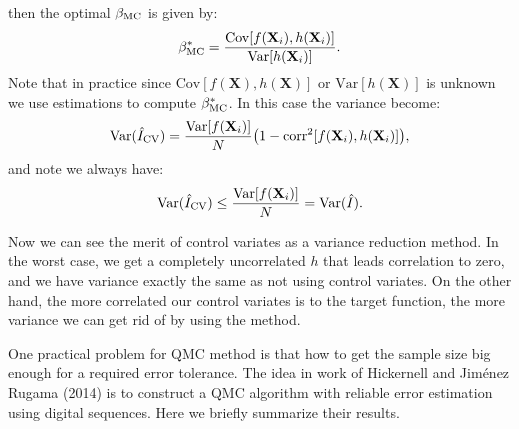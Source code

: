then the optimal $\beta_{\mathrm{MC}}$ is given by: 
\begin{equation}
    \beta_{\mathrm{MC}}^*=\frac{\mathrm{Cov}[f(\mathbf{X}_i),h(\mathbf{X}_i)]}{\mathrm{Var}[h(\mathbf{X}_i)]}.
    \label{eq:optBeta}
\end{equation}
Note that in practice since $\mathrm{Cov}[f(\mathbf{X}),h(\mathbf{X})]$ or $\mathrm{Var}[h(\mathbf{X})]$ is unknown we use estimations to compute $\beta_{\mathrm{MC}}^*$.  
In this case the variance become:
\[
    \mathrm{Var}(\hat{I}_{\mathrm{CV}})= \frac{\mathrm{Var}[f(\mathbf{X}_i)]}{N}\big(1-\mathrm{corr}^2[f(\mathbf{X}_i), h(\mathbf{X}_i)]\big),
\]
and note we always have: 
\[
\mathrm{Var}(\hat{I}_{\mathrm{CV}}) \leq \frac{\mathrm{Var}[f(\mathbf{X}_i)]}{N}=\mathrm{Var}(\hat{I}).
\]

Now we can see the merit of control variates as a variance reduction method. 
In the worst case, we get a completely uncorrelated $h$ that leads correlation to zero, and we have variance exactly the same as not using control variates. On the other hand, the more correlated our control variates is to the target function, the more variance we can get rid of by using the method.


One practical problem for QMC method is that how to get the sample size big enough for a required error tolerance. 
The idea in work of Hickernell and Jim{\'e}nez Rugama (2014)\cite{hickernell2014reliable} is to construct a QMC algorithm with reliable error estimation using digital sequences. 
Here we briefly summarize their results.

